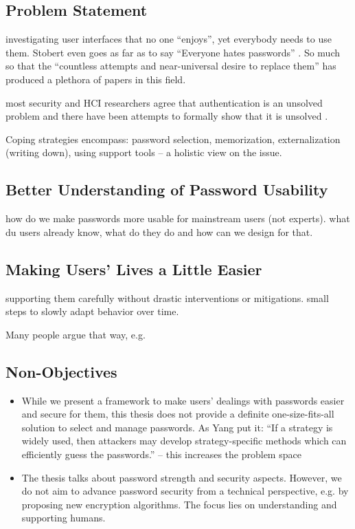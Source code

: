 \subsection{Problem Statement}
investigating user interfaces that no one ``enjoys'', yet everybody needs to use them. Stobert even goes as far as to say ``Everyone hates passwords'' \cite{Stobert2014Agony}. So much so that the ``countless attempts and near-universal desire to replace them''  \cite{Herley2012PersistenceOfPasswords} has produced a plethora of papers in this field.

most security and HCI researchers agree that authentication is an unsolved problem and there have been attempts to formally show that it is unsolved \cite{Bonneau2012ReplacePasswords, Bonneau2015ImperfectAuthentication, Herley2012PersistenceOfPasswords}. 


Coping strategies encompass: password selection, memorization, externalization (writing down), using support tools -- a holistic view on the issue. 


\subsection{Better Understanding of Password Usability}
how do we make passwords more usable for mainstream users (not experts). what du users already know, what do they do and how can we design for that. 

\subsection{Making Users' Lives a Little Easier}
supporting them carefully without drastic interventions or mitigations. small steps to slowly adapt behavior over time. 

Many people argue that way, e.g. \cite{Herley2012PersistenceOfPasswords}


\subsection{Non-Objectives}\label{sec:intro:non_objectives}

\begin{itemize}
	\item While we present a framework to make users' dealings with passwords easier and secure for them, this thesis does not provide a definite one-size-fits-all solution to select and manage passwords. As Yang \etal put it: ``If a strategy is widely used, then attackers may develop strategy-specific methods which can efficiently guess the passwords.'' -- this increases the problem space 
	\item The thesis talks about password strength and security aspects. However, we do not aim to advance password security from a technical perspective, e.g. by proposing new encryption algorithms. The focus lies on understanding and supporting humans. 
\end{itemize}


